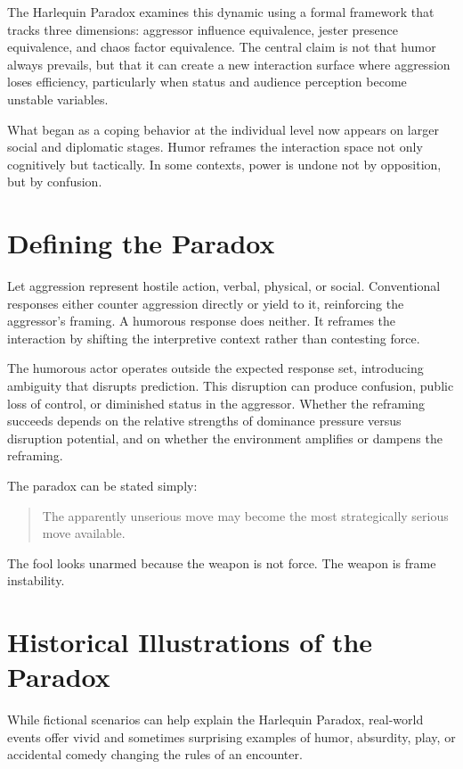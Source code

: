 \documentclass[11pt]{article}
\begin{document}
The Harlequin Paradox examines this dynamic using a formal framework that tracks three dimensions: aggressor influence equivalence, jester presence equivalence, and chaos factor equivalence. The central claim is not that humor always prevails, but that it can create a new interaction surface where aggression loses efficiency, particularly when status and audience perception become unstable variables.

What began as a coping behavior at the individual level now appears on larger social and diplomatic stages. Humor reframes the interaction space not only cognitively but tactically. In some contexts, power is undone not by opposition, but by confusion.

\section{Defining the Paradox}

Let aggression represent hostile action, verbal, physical, or social. Conventional responses either counter aggression directly or yield to it, reinforcing the aggressor's framing. A humorous response does neither. It reframes the interaction by shifting the interpretive context rather than contesting force.

The humorous actor operates outside the expected response set, introducing ambiguity that disrupts prediction. This disruption can produce confusion, public loss of control, or diminished status in the aggressor. Whether the reframing succeeds depends on the relative strengths of dominance pressure versus disruption potential, and on whether the environment amplifies or dampens the reframing.

The paradox can be stated simply:

\begin{quote}
The apparently unserious move may become the most strategically serious move available.
\end{quote}

The fool looks unarmed because the weapon is not force. The weapon is frame instability.

\section{Historical Illustrations of the Paradox}

While fictional scenarios can help explain the Harlequin Paradox, real-world events offer vivid and sometimes surprising examples of humor, absurdity, play, or accidental comedy changing the rules of an encounter.
\end{document}
